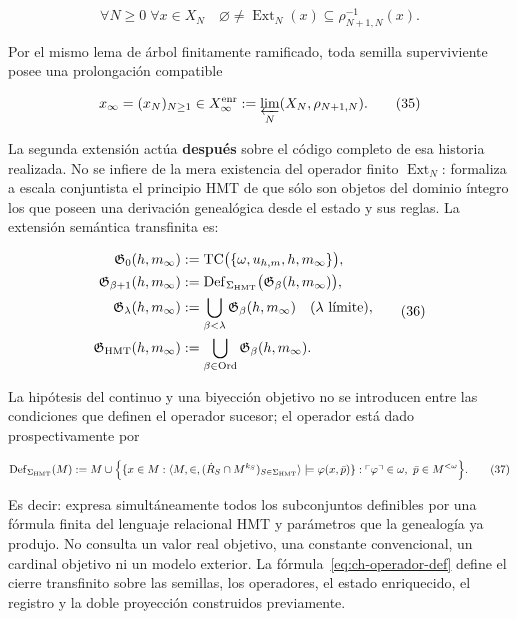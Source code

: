 \[
 \forall N\ge0\;\forall x\in X_N\quad
 \varnothing\ne\operatorname{Ext}_N(x)
 \subseteq\rho_{N+1,N}^{-1}(x).
\tag{34}\label{eq:ch-extension-no-vacia}
\]

Por el mismo lema de árbol finitamente ramificado, toda semilla superviviente
posee una prolongación compatible

\[
 x_\infty=(x_N)_{N\ge1}\in
 X_\infty^{\rm enr}:=\varprojlim_N(X_N,\rho_{N+1,N}).
\tag{35}\label{eq:ch-limite-inverso}
\]

La segunda extensión actúa \textbf{después} sobre el código completo de esa
historia realizada.
No se infiere de la mera existencia del operador finito
\(\operatorname{Ext}_N\): formaliza a escala conjuntista el principio HMT de
que sólo son objetos del dominio íntegro los que poseen una derivación
genealógica desde el estado y sus reglas. La extensión semántica transfinita
es:

\[
 \begin{aligned}
  \mathfrak G_0(h,m_\infty)
  &:=\operatorname{TC}\bigl(\{\omega,u_{h,m},h,m_\infty\}\bigr),\\
  \mathfrak G_{\beta+1}(h,m_\infty)
  &:=\operatorname{Def}_{\Sigma_{\rm HMT}}
       \bigl(\mathfrak G_\beta(h,m_\infty)\bigr),\\
  \mathfrak G_\lambda(h,m_\infty)
  &:=\bigcup_{\beta<\lambda}\mathfrak G_\beta(h,m_\infty)
       \quad(\lambda\text{ límite}),\\
  \mathfrak G_{\rm HMT}(h,m_\infty)
  &:=\bigcup_{\beta\in\operatorname{Ord}}
       \mathfrak G_\beta(h,m_\infty).
 \end{aligned}
\tag{36}\label{eq:ch-clausura-transfinita}
\]

La hipótesis del continuo y una biyección objetivo no se introducen entre las
condiciones que definen el operador sucesor; el operador está dado
prospectivamente por

\[
 \operatorname{Def}_{\Sigma_{\rm HMT}}(M)
 :=M\cup
 \Bigl\{
   \{x\in M:\langle M,\in,
       (\dot R_S\cap M^{k_S})_{S\in\Sigma_{\rm HMT}}\rangle
       \models\varphi(x,\bar p)\}:
   \ulcorner\varphi\urcorner\in\omega,
   \ \bar p\in M^{<\omega}
 \Bigr\}.
\tag{37}\label{eq:ch-operador-def}
\]

Es decir: expresa simultáneamente todos los subconjuntos definibles por una
fórmula finita del lenguaje relacional HMT y parámetros que la genealogía ya
produjo. No
consulta un valor real objetivo, una constante convencional, un cardinal
objetivo ni un modelo exterior. La fórmula~\eqref{eq:ch-operador-def} define el cierre transfinito
sobre las semillas, los operadores, el estado enriquecido, el registro y la
doble proyección construidos previamente.

